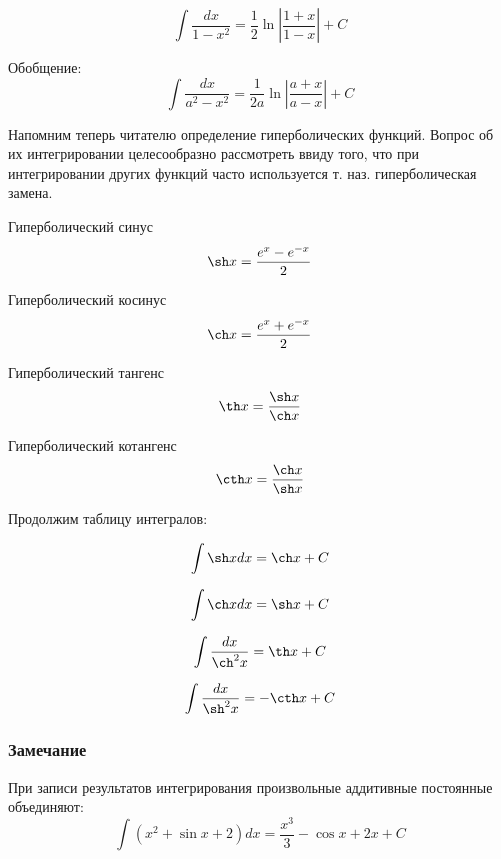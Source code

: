 \begin{list}{.}{}
$$
\int \frac{dx}{1-x^2}= \frac{1}{2} \ln \left| \frac{1+x}{1-x}\right|+C
$$

Обобщение:
$$
\int \frac{dx}{a^2-x^2}= \frac{1}{2a} \ln \left| \frac{a+x}{a-x}\right|+C
$$


Напомним теперь читателю определение гиперболических функций.
Вопрос об их интегрировании целесообразно рассмотреть ввиду того, что при интегрировании других функций часто используется т. наз. гиперболическая замена.

\opred

Гиперболический синус $$\sh x=\frac{e^x - e^{-x}}{2}$$

\opred

Гиперболический косинус $$\ch x=\frac{e^x + e^{-x}}{2}$$

\opred

Гиперболический тангенс $$\th x=\frac{\sh x}{\ch x}$$

\opred

Гиперболический котангенс $$\cth x=\frac{\ch x}{\sh x}$$

Продолжим таблицу интегралов:


\item
$$
\int \sh x dx= \ch x+C
$$

\item
$$
\int \ch x dx= \sh x+C
$$

\item
$$
\int \frac{dx}{\ch^2 x}= \th x+C
$$

\item
$$
\int \frac{dx}{\sh^2 x}= -\cth x+C
$$

\end{list}

\subsubsection{Замечание}

При записи результатов интегрирования произвольные аддитивные постоянные объединяют:
$$\int(x^2 + \sin x + 2)dx=\frac{x^3}{3}-\cos x + 2x +C$$


